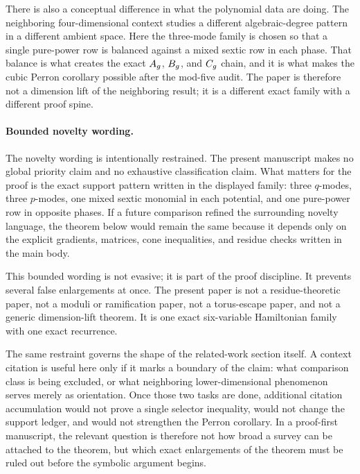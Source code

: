 \documentclass[11pt]{article}
\theoremstyle{remark}
\numberwithin{equation}{section}
\begin{document}
There is also a conceptual difference in what the polynomial data are doing.
The neighboring four-dimensional context studies a different algebraic-degree
pattern in a different ambient space.  Here the three-mode family is chosen so
that a single pure-power row is balanced against a mixed sextic row in each
phase.  That balance is what creates the exact \(A_g\), \(B_g\), and \(C_g\)
chain, and it is what makes the cubic Perron corollary possible after the
mod-five audit.  The paper is therefore not a dimension lift of the neighboring
result; it is a different exact family with a different proof spine.

\paragraph{Bounded novelty wording.}
The novelty wording is intentionally restrained.  The present manuscript makes
no global priority claim and no exhaustive classification claim.  What matters
for the proof is the exact support pattern written in the displayed family:
three \(q\)-modes, three \(p\)-modes, one mixed sextic monomial in each
potential, and one pure-power row in opposite phases.  If a future comparison
refined the surrounding novelty language, the theorem below would remain the
same because it depends only on the explicit gradients, matrices, cone
inequalities, and residue checks written in the main body.

This bounded wording is not evasive; it is part of the proof discipline.  It
prevents several false enlargements at once.  The present paper is not a
residue-theoretic paper, not a moduli or ramification paper, not a torus-escape
paper, and not a generic dimension-lift theorem.  It is one exact six-variable
Hamiltonian family with one exact recurrence.

The same restraint governs the shape of the related-work section itself.  A
context citation is useful here only if it marks a boundary of the claim: what
comparison class is being excluded, or what neighboring lower-dimensional
phenomenon serves merely as orientation.  Once those two tasks are done,
additional citation accumulation would not prove a single selector inequality,
would not change the support ledger, and would not strengthen the Perron
corollary.  In a proof-first manuscript, the relevant question is therefore not
how broad a survey can be attached to the theorem, but which exact enlargements
of the theorem must be ruled out before the symbolic argument begins.
\end{document}
